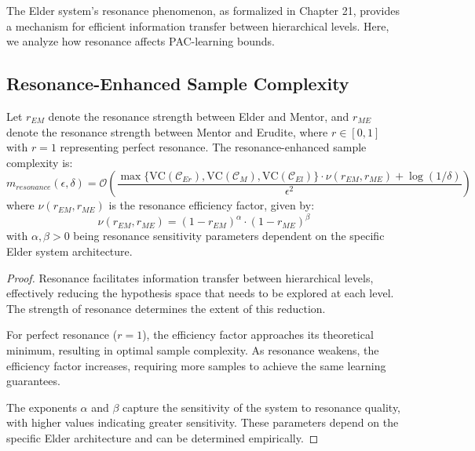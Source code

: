 The Elder system's resonance phenomenon, as formalized in Chapter 21, provides a mechanism for efficient information transfer between hierarchical levels. Here, we analyze how resonance affects PAC-learning bounds.



\subsection{Resonance-Enhanced Sample Complexity}

\begin{theorem}
Let $r_{EM}$ denote the resonance strength between Elder and Mentor, and $r_{ME}$ denote the resonance strength between Mentor and Erudite, where $r \in [0, 1]$ with $r = 1$ representing perfect resonance. The resonance-enhanced sample complexity is:
\begin{equation}
m_{resonance}(\epsilon, \delta) = \mathcal{O}\left(\frac{\max\{\text{VC}(\mathcal{C}_{Er}), \text{VC}(\mathcal{C}_{M}), \text{VC}(\mathcal{C}_{El})\} \cdot \nu(r_{EM}, r_{ME}) + \log(1/\delta)}{\epsilon^2}\right)
\end{equation}
where $\nu(r_{EM}, r_{ME})$ is the resonance efficiency factor, given by:
\begin{equation}
\nu(r_{EM}, r_{ME}) = (1 - r_{EM})^{\alpha} \cdot (1 - r_{ME})^{\beta}
\end{equation}
with $\alpha, \beta > 0$ being resonance sensitivity parameters dependent on the specific Elder system architecture.
\end{theorem}

\begin{proof}
Resonance facilitates information transfer between hierarchical levels, effectively reducing the hypothesis space that needs to be explored at each level. The strength of resonance determines the extent of this reduction.

For perfect resonance ($r = 1$), the efficiency factor approaches its theoretical minimum, resulting in optimal sample complexity. As resonance weakens, the efficiency factor increases, requiring more samples to achieve the same learning guarantees.

The exponents $\alpha$ and $\beta$ capture the sensitivity of the system to resonance quality, with higher values indicating greater sensitivity. These parameters depend on the specific Elder architecture and can be determined empirically.
\end{proof}


